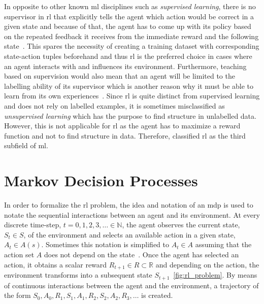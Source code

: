 \documentclass[draft,final]{vutinfth} %
\newcommand{\p}[1]{see p. #1}
\begin{document}
    In opposite to other known \gls{ml} disciplines such as \textit{supervised learning}, there is no supervisor in \gls{rl} that explicitly tells the agent which action would be correct in a given state and because of that, the agent has to come up with its policy based on the repeated feedback it receives from the immediate reward and the following state~\citep{kaelbling_reinforcement_1996}.
    This spares the necessity of creating a training dataset with corresponding state-action tuples beforehand and thus \gls{rl} is the preferred choice in cases where an agent interacts with and influences its environment.
    Furthermore, teaching based on supervision would also mean that an agent will be limited to the labelling ability of its supervisor which is another reason why it must be able to learn from its own experiences~.
    Since \gls{rl} is quite distinct from supervised learning and does not rely on labelled examples, it is sometimes misclassified as \textit{unsupervised learning} which has the purpose to find structure in unlabelled data.
    However, this is not applicable for \gls{rl} as the agent has to maximize a reward function and not to find structure in data.
    Therefore, \citet[\p{2}]{sutton_reinforcement_2018} classified \gls{rl} as the third subfield of \gls{ml}.


    \section{Markov Decision Processes}\label{sec:markov-decision-processes}
    In order to formalize the \gls{rl} problem, the idea and notation of an \gls{mdp} is used to notate the sequential interactions between an agent and its environment.
    At every discrete time-step, $t = 0,1,2,3, \ldots \in \mathbb{N}$, the agent observes the current state, $S_t \in \mathit{S}$, of the environment and selects an available action in a given state, $A_t \in \mathit{A}(s)$.
    Sometimes this notation is simplified to $A_t \in \mathit{A}$ assuming that the action set $\mathit{A}$ does not depend on the state~\citep[\p{48}]{sutton_reinforcement_2018}.
    Once the agent has selected an action, it obtains a scalar reward $R_{t+1} \in \mathit{R} \subset \mathbb{R}$ and depending on the action, the environment transforms into a subsequent state $S_{t+1}$~\eqref{fig:rl_problem}.
    By means of continuous interactions between the agent and the environment, a trajectory of the form $S_0,A_0,R_1,S_1,A_1,R_2,S_2,A_2,R_3,\ldots$ is created.
\end{document}
